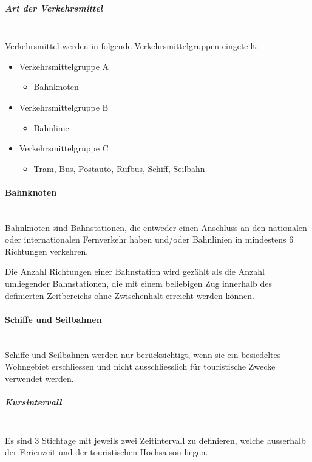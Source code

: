 \subparagraph{Art der Verkehrsmittel}~\\
\label{Berechnungsmethodik OeVGK18:Art der Verkehrsmittel}
Verkehrsmittel werden in folgende Verkehrsmittelgruppen eingeteilt:

\begin{itemize}[noitemsep]
    \item Verkehrsmittelgruppe A
    \begin{itemize}
        \item Bahnknoten
    \end{itemize}
    \item Verkehrsmittelgruppe B
    \begin{itemize}
        \item Bahnlinie
    \end{itemize}
    \item Verkehrsmittelgruppe C
    \begin{itemize}
        \item Tram, Bus, Postauto, Rufbus, Schiff, Seilbahn
    \end{itemize}
\end{itemize}

\paragraph{Bahnknoten}~\\
Bahnknoten sind Bahnstationen, die entweder einen Anschluss an den nationalen oder internationalen Fernverkehr haben und/oder Bahnlinien in mindestens 6 Richtungen verkehren.

Die Anzahl Richtungen einer Bahnstation wird gezählt als die Anzahl umliegender Bahnstationen, die mit einem beliebigen Zug innerhalb des definierten Zeitbereichs ohne Zwischenhalt erreicht werden können.

\paragraph{Schiffe und Seilbahnen}~\\
Schiffe und Seilbahnen werden nur berücksichtigt, wenn sie ein besiedeltes Wohngebiet erschliessen und nicht ausschliesslich für touristische Zwecke verwendet werden.


\subparagraph{Kursintervall}~\\
\label{Berechnungsmethodik OeVGK18:Kursintervall}
Es sind 3 Stichtage mit jeweils zwei Zeitintervall zu definieren, welche ausserhalb der Ferienzeit und der touristischen Hochsaison liegen.

